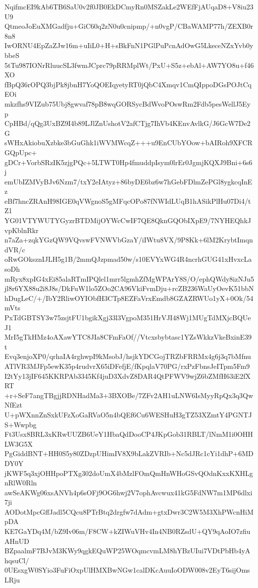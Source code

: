 NqifmcEI9kAb6TB6SaU0v2f0JB0EkDCmyRn0MSZakLe2WEfFjAUqaD8+V8iu23U9
QtmeoJoEuXMGadfju+GiC60q2zN0u0cnipmp/+n0vgP/CBaWAMP77h/ZEXB0r8n8
IwORNU4EpZaZJw16m+uIiL0+H+sBkFnN1PGlPuPcnAdOwG5LkeceNZxYvb0ybbeS
5tTu987IONrRluucSL3fwmJCprc79pRRMplWt/PxU+S5z+ebAl+AW7YO8u+f46XO
fBpQ36rOPQ3bjPk8jbnH7YoQOEIqyetyRT0jQbC4Xmqv1CmQIppoDGsPOJtCqEOi
mkzfhs9VIZub75Ubj8gwvaf78pB8wqGORSycBdWvoPOswRm2Fdb5pesWellJ5Eyp
CpHBd/qQg3UxBZ9I4b89LJlZnUshotV2afCTjg7IhVb4KEnvAvlkG/J6GcW7De2G
sWHxAkiobuXzbke3bGuGhk1iWVMWcqZ+++u9EnCUbYOow+bAIRoh9XFCRGQpUpc+
gDCr+VorbSRzIK5zjgPQc+5LTWT0Hp4fmuddpIsym0lrEr0JgmjKQXJ9Bni+6s6j
emUbIZMVyBJv6Nzm7/txY2eIAtyz+86byDE6bz6w7hGebFDlmZePGl8ygkcqInEz
eBf7hncZRAnH98IGE0qVWgnoS5gMFqcOPo87fNWIdLUqB1hASikPlHu07Di4/tZ1
YG01VTYWUTYGyzrBTDMijOYWcCwIF7QE8QknGQObIXpE9/7NYHEQhkJvpKblnRkr
n7aZa+zqkYGzQW9VQvswFVNWVbGzaY/iIWtu8VX/9P8Kk+6lM2KrybtImqndVR/c
oRwGOksznIJLH5g1B/2mmQJzpmad50w/s10EVYxWG4R4ncrhGUG41xHvxcLasoDh
mRyx8xpIG4xEi85alaRTmIPQlel1mrr5lgmhZfMgWPArY8S/O/ephQWdy8izNJu5
jl8r6YX88u2i8J8s/DkFuW1lo5ZOo2CA96VkiFvmDju+rcZB236WaUyOevK51bbN
hDugLeC/+/IbY2RliwOYIObfH3CTp8EZFaVrxEmdb8GZAZRWUo1yX+0Ok/54mVts
PxTdGBTSY3w75zsjtFU1bgikXgj33l3VgpoM351HrVJI48Wj1MUgTdMXjcBQUeJ1
MrI5gTkHMz4oAXawYTC8JIa8CFmFaOf//Vtcxsbybtasc1YZsWkkzVkeBxinE39t
Evq3enjoXP0/qrhaIA4rghwpI9kMsobJ/hsjkYDCGojTRZbFRRMx4g6j3q7bMfnu
ATlVR3MJFp5ewK35p4rudvrX65iDFefjE/fKpqlaV70PG/rxPzFbnsJeITpm5Fm9
I2tYy13jIF645KKRPAb3345Kf4juD3XdvZ8DAR4QtPFWV9wjZ6bZMfH63iE2fXRT
+r+SeF7angTBgjjRDNHadMa3+3BXOBe/7ZFv2AH1uLNW6IsMyyRpQx3q3QwNfEzt
U+pWXnnZnSxkUFzXoGaRVaO5n4bQEf6Cu6WESHuH3gTZ53XZmtY4PGNTJS+Wwpbg
Ft3Usx8BRL3xKRwUUZB6UeY1HbaQdDooCP4JKpGob31RBLT/lNmM1i0OHHLW3G5X
PgGiddBNT+HH0S5y80ZDzpUHimIV8X9bLakZVRIb+Nc5dJRc1cYi1dhP+6MDDY0Y
jKWF5q3xjOHHpoPTXg302doUmX4bMzlFOmQmHnWHoGSvQOdnKxxKXHLgnRlW0Rln
awSeAKWg06xsANVh4p6sOFj9OG6hwj2V7ophAvcwux41kG5FdNW7m1MP6dlxi7ji
AODotMpcGffJadl5CQcu8PTrBtq2drgfw7dAdm+gtxDwr3C2W5M3XhPWcnHiMpDA
KE7GaYDq4M/bZ9Iv06m/F8CW+kZIWuVHv4In4NB0RZsdU+QY9qAoIO7zfiuAHnUD
BZpaalmF7BJvM3KWy9qgkEQuWP25WOqmcvmLM8hYBzUIui7VDtPbHb4yAhqsuCl/
0UEsxgW0SYio3FuFiOxpUlHMXBwNGw1calDKcAuuIoODW008v2EyT6sijOmsLRju
